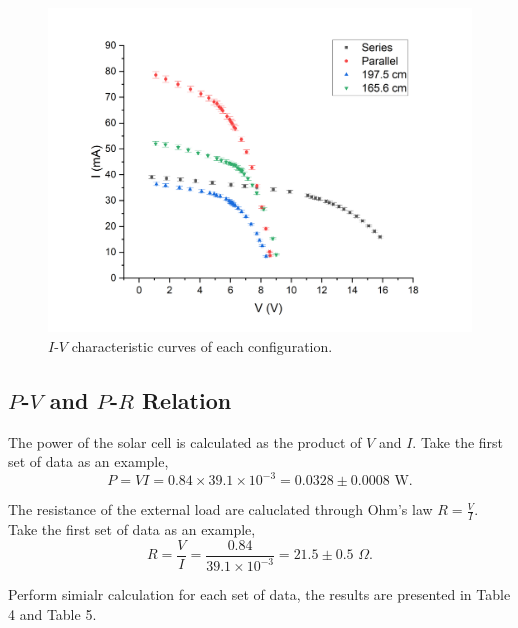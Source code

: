 \documentclass{article}
\begin{document}
{\begin{figure}[H]\centering
    \includegraphics[scale=0.4]{I_V.png}
    \caption{$I$-$V$ characteristic curves of each configuration.}\label{FigI_V}
\end{figure}

\subsection{$P$-$V$ and $P$-$R$ Relation}

The power of the solar cell is calculated as the product of $V$ and $I$. Take the first set of data as an example,
$$P = VI = 0.84 \times 39.1 \times 10^{-3} = 0.0328 \pm 0.0008\,\,\text{W}.$$

The resistance of the external load are caluclated through Ohm's law $\displaystyle R = \frac{V}{I}$. Take the first set of data as an example,
$$R = \frac{V}{I} = \frac{0.84}{39.1\times 10^{-3}} = 21.5 \pm 0.5\,\,\Omega.$$

Perform simialr calculation for each set of data, the results are presented in Table 4 and Table 5.

}
\end{document}

